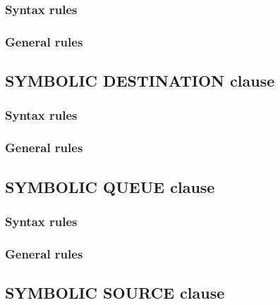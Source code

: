 \subsubsection{Syntax rules}

\subsubsection{General rules}

\subsection{SYMBOLIC DESTINATION clause}

\begin{syntax}[\deletedcolour]
\end{syntax}

\subsubsection{Syntax rules}

\subsubsection{General rules}

\subsection{SYMBOLIC QUEUE clause}

\begin{syntax}[\deletedcolour]
\end{syntax}

\subsubsection{Syntax rules}

\subsubsection{General rules}

\subsection{SYMBOLIC SOURCE clause}

\begin{syntax}[\deletedcolour]
\end{syntax}

